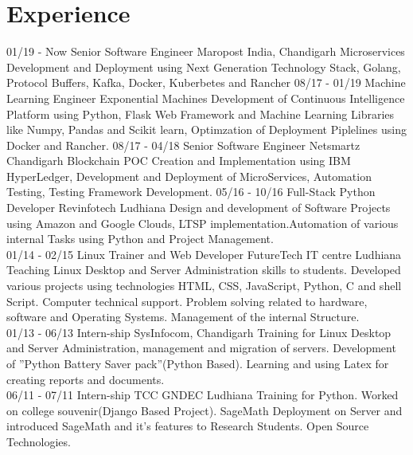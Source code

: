 \documentclass[]{friggeri-cv}
\begin{document}
\section{Experience}
\begin{entrylist}
  \entry
    {01/19 - Now }
    {Senior Software Engineer}
    {Maropost India, Chandigarh}
    {Microservices Development and Deployment using Next Generation Technology Stack, Golang, Protocol Buffers, Kafka, Docker, Kuberbetes and Rancher}
  \entry
    {08/17 - 01/19}
    {Machine Learning Engineer}
    {Exponential Machines}
    {Development of Continuous Intelligence Platform using Python, Flask Web Framework and Machine Learning Libraries like Numpy, Pandas and Scikit learn, Optimzation of Deployment Piplelines using Docker and Rancher. }
   \entry
    {08/17 - 04/18}
    {Senior Software Engineer}
    {Netsmartz Chandigarh}
    {Blockchain POC Creation and Implementation using IBM HyperLedger, Development and Deployment of MicroServices, Automation Testing, Testing Framework Development.}
  \entry
    {05/16 - 10/16}
    {Full-Stack Python Developer}
    {Revinfotech Ludhiana}
    {Design and development of Software Projects using Amazon and Google Clouds, LTSP implementation.Automation of various internal Tasks using Python and Project Management.\\}
    \entry
    {01/14 - 02/15}
    {Linux Trainer and Web Developer}
    {FutureTech IT centre Ludhiana}
    {Teaching Linux Desktop and Server Administration skills to students. Developed various projects using technologies HTML, CSS, JavaScript, Python,
C and shell Script. Computer technical support. Problem solving related to hardware, software and Operating Systems. Management of the internal Structure.\\}
    \entry
    {01/13 - 06/13}
    {Intern-ship}
    {SysInfocom, Chandigarh}
    {Training for Linux Desktop and Server Administration, management and migration of servers. Development of ”Python Battery Saver pack”(Python Based). Learning and using Latex for creating reports and documents.\\}
    \entry
    {06/11 - 07/11}
    {Intern-ship}
    {TCC GNDEC Ludhiana}
    {Training for Python. Worked on college souvenir(Django Based Project).
SageMath Deployment on Server and introduced SageMath and it’s features
to Research Students. Open Source Technologies.\\}
\end{entrylist}
\end{document}
